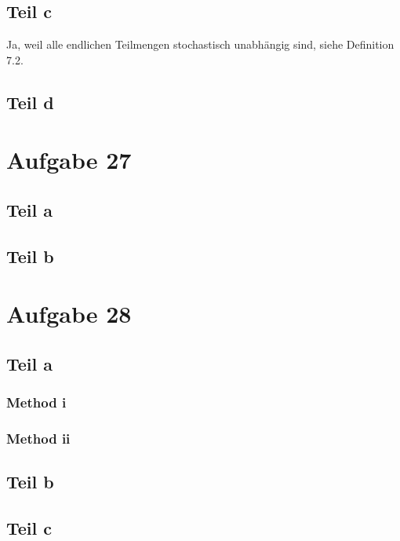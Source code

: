 \documentclass[10pt,a4paper]{article}
\begin{document}
\subsection{Teil c}
Ja, weil alle endlichen Teilmengen stochastisch unabhängig sind, siehe Definition 7.2.

\subsection{Teil d}


\section{Aufgabe 27}

\subsection{Teil a}

\subsection{Teil b}

\section{Aufgabe 28}

\subsection{Teil a}

\subsubsection{Method i}

\subsubsection{Method ii}

\subsection{Teil b}

\subsection{Teil c}
\end{document}
